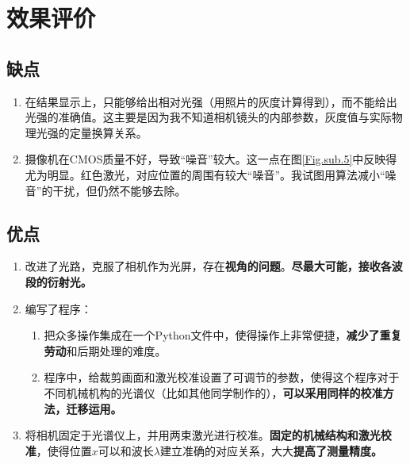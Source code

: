\documentclass[UTF8]{ctexart}
\begin{document}
\section{效果评价}
\subsection{缺点}
\begin{enumerate}
    \item 在结果显示上，只能够给出相对光强（用照片的灰度计算得到），而不能给出光强的准确值。这主要是因为我不知道相机镜头的内部参数，灰度值与实际物理光强的定量换算关系。
    \item 摄像机在CMOS质量不好，导致“噪音”较大。这一点在图\ref{Fig.sub.5}中反映得尤为明显。红色激光，对应位置的周围有较大“噪音”。我试图用算法减小“噪音”的干扰，但仍然不能够去除。
\end{enumerate}
\subsection{优点}
\begin{enumerate}
    \item 改进了光路，克服了相机作为光屏，存在\textbf{视角的问题}。\textbf{尽最大可能，接收各波段的衍射光。}
    \item 编写了程序：
    \begin{enumerate}
        \item 把众多操作集成在一个Python文件中，使得操作上非常便捷，\textbf{减少了重复劳动}和后期处理的难度。
        \item 程序中，给裁剪画面和激光校准设置了可调节的参数，使得这个程序对于不同机械机构的光谱仪（比如其他同学制作的），\textbf{可以采用同样的校准方法，迁移运用。}
    \end{enumerate}
    \item 将相机固定于光谱仪上，并用两束激光进行校准。\textbf{固定的机械结构和激光校准}，使得位置$x$可以和波长$\lambda$建立准确的对应关系，大大\textbf{提高了测量精度。}
\end{enumerate}
\end{document}
